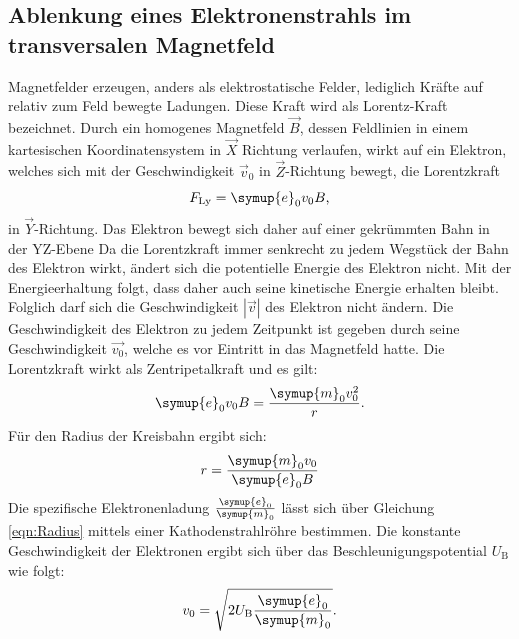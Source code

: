 \subsection{Ablenkung eines Elektronenstrahls im transversalen Magnetfeld}
Magnetfelder erzeugen, anders als elektrostatische Felder, lediglich Kräfte auf relativ zum Feld bewegte Ladungen. Diese Kraft wird als Lorentz-Kraft bezeichnet.
Durch ein homogenes Magnetfeld $\vec{B}$, dessen Feldlinien in einem kartesischen Koordinatensystem in $\vec{X}$ Richtung verlaufen, wirkt auf ein Elektron, welches sich mit der Geschwindigkeit $\vec{v}_0$ in $\vec{Z}$-Richtung bewegt, die Lorentzkraft
\begin{equation}
  F_\mathrm{Ly}=\symup{e}_0v_0B \text{,}
\end{equation}
in $\vec{Y}$-Richtung.
Das Elektron bewegt sich daher auf einer gekrümmten Bahn in der YZ-Ebene
Da die Lorentzkraft immer senkrecht zu jedem Wegstück der Bahn des Elektron wirkt, ändert sich die potentielle Energie des Elektron nicht.
Mit der Energieerhaltung folgt, dass daher auch seine kinetische Energie erhalten bleibt.\\
Folglich darf sich die Geschwindigkeit $|\vec{v}|$ des Elektron nicht ändern.
Die Geschwindigkeit des Elektron zu jedem Zeitpunkt ist gegeben durch seine Geschwindigkeit $\vec{v_0}$, welche es vor Eintritt in das Magnetfeld hatte.
Die Lorentzkraft wirkt als Zentripetalkraft und es gilt:
\begin{equation}
    \symup{e}_0v_0B=\frac{\symup{m}_0v_0^2}{r} \text{.}
\end{equation}
Für den Radius der Kreisbahn ergibt sich:
\begin{equation}
  \label{eqn:Radius}
  r=\frac{\symup{m}_0v_0}{\symup{e}_0B}
\end{equation}
Die spezifische Elektronenladung $\frac{\symup{e}_0}{\symup{m}_0}$ lässt sich über Gleichung \eqref{eqn:Radius} mittels einer Kathodenstrahlröhre bestimmen.
Die konstante Geschwindigkeit der Elektronen ergibt sich über das Beschleunigungspotential $U_\mathrm{B}$ wie folgt:
\begin{equation}
  \label{eqn:vnull}
  v_0=\sqrt{2U_\mathrm{B}\frac{\symup{e}_0}{\symup{m}_0}} \text{.}
\end{equation}
